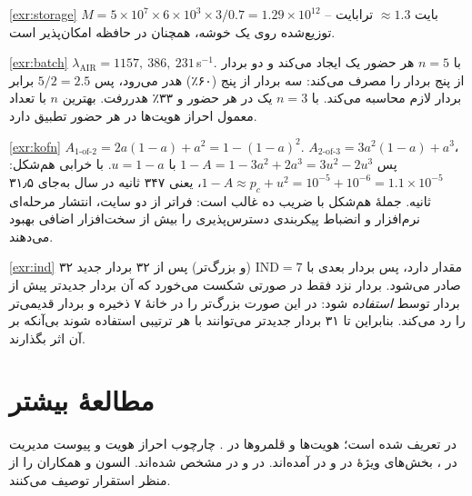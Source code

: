 \documentclass[11pt,a4paper]{article}
\begin{document}
\begin{solutionbox}{\ref{exr:storage}}
$M = 5\times10^7\times6\times10^3\times3/0.7 = 1.29\times10^{12}$ بایت $\approx 1.3$ ترابایت -- توزیع‌شده روی یک خوشه،
همچنان در حافظه امکان‌پذیر است.
\end{solutionbox}

\begin{solutionbox}{\ref{exr:batch}}
$\lambda_{\mathrm{AIR}} = 1157,\ 386,\ 231$\,s$^{-1}$. با $n=5$ هر حضور یک  ایجاد می‌کند و دو بردار از پنج بردار را
مصرف می‌کند: سه بردار از پنج (۶۰٪) هدر می‌رود، پس  $5/2 = 2.5$ برابر بردار لازم محاسبه می‌کند. با $n = 3$
یک  در هر حضور و ۳۳٪ هدررفت. بهترین $n$ با تعداد معمول احراز هویت‌ها در هر حضور تطبیق دارد.
\end{solutionbox}

\begin{solutionbox}{\ref{exr:kofn}}
$A_{1\text{-of-}2} = 2a(1-a) + a^2 = 1-(1-a)^2$. $A_{2\text{-of-}3} = 3a^2(1-a) + a^3$، پس $1-A = 1 - 3a^2 + 2a^3
= 3u^2 - 2u^3$ با $u = 1-a$. با خرابی هم‌شکل: $1-A \approx p_c + u^2 = 10^{-5} + 10^{-6} = 1.1\times10^{-5}$، یعنی ۳۴۷
ثانیه در سال به‌جای ۳۱٫۵ ثانیه. جملهٔ هم‌شکل با ضریب ده غالب است: فراتر از دو سایت، انتشار مرحله‌ای نرم‌افزار و انضباط
پیکربندی دسترس‌پذیری را بیش از سخت‌افزار اضافی بهبود می‌دهند.
\end{solutionbox}

\begin{solutionbox}{\ref{exr:ind}}
 ۳۲ مقدار دارد، پس بردار بعدی با $\mathrm{IND} = 7$ (و  بزرگ‌تر) پس از ۳۲ بردار جدید صادر می‌شود.
بردار نزد  فقط در صورتی شکست می‌خورد که آن بردار جدیدتر پیش از بردار  توسط 
\emph{استفاده} شود: در این صورت   بزرگ‌تر را در خانهٔ ۷ ذخیره و بردار قدیمی‌تر را رد می‌کند. بنابراین
تا ۳۱ بردار جدیدتر می‌توانند با هر ترتیبی استفاده شوند بی‌آنکه بر آن اثر بگذارند.
\end{solutionbox}

\section{مطالعهٔ بیشتر}
 در  \cite{ts23002} تعریف شده است؛ هویت‌ها و قلمروها در  \cite{ts23003}. چارچوب
احراز هویت و پیوست مدیریت  در  \cite{ts33102}، بخش‌های ویژهٔ  در 
\cite{ts33401} و  در  \cite{ts35206} آمده‌اند.  در  \cite{ts29272} و
 در  \cite{ts29002} مشخص شده‌اند. السون و همکاران \cite{olsson2013epc}  را از منظر
استقرار توصیف می‌کنند.

\begin{latin}
\printbibliography[heading=subbibliography,title={References}]
\end{latin}
\end{document}
